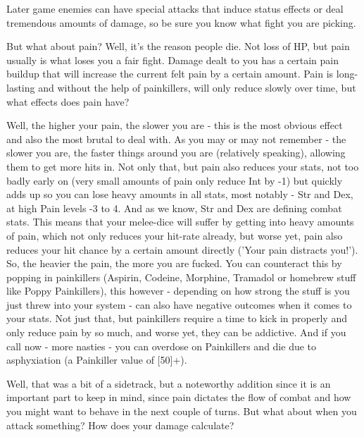 \documentclass[11pt]{report}
\begin{document}
Later game enemies can have special attacks that induce status effects or deal tremendous amounts of damage, so be sure you know what fight you are picking.

But what about pain? Well, it's the reason people die. Not loss of HP, but pain usually is what loses you a fair fight. Damage dealt to you has a certain pain buildup that will increase the current felt pain by a certain amount. Pain is long-lasting and without the help of painkillers, will only reduce slowly over time, but what effects does pain have?

Well, the higher your pain, the slower you are - this is the most obvious effect and also the most brutal to deal with. As you may or may not remember - the slower you are, the faster things around you are (relatively speaking), allowing them to get more hits in. Not only that, but pain also reduces your stats, not too badly early on (very small amounts of pain only reduce Int by -1) but quickly adds up so you can lose heavy amounts in all stats, most notably - Str and Dex, at high Pain levels -3 to 4. And as we know, Str and Dex are defining combat stats. This means that your melee-dice will suffer by getting into heavy amounts of pain, which not only reduces your hit-rate already, but worse yet, pain also reduces your hit chance by a certain amount directly ('Your pain distracts you!'). So, the heavier the pain, the more you are fucked. You can counteract this by popping in painkillers (Aspirin, Codeine, Morphine, Tramadol or homebrew stuff like Poppy Painkillers), this however - depending on how strong the stuff is you just threw into your system - can also have negative outcomes when it comes to your stats. Not just that, but painkillers require a time to kick in properly and only reduce pain by so much, and worse yet, they can be addictive. And if you call now - more nasties - you can overdose on Painkillers and die due to asphyxiation (a Painkiller value of [50]+).

Well, that was a bit of a sidetrack, but a noteworthy addition since it is an important part to keep in mind, since pain dictates the flow of combat and how you might want to behave in the next couple of turns. But what about when you attack something? How does your damage calculate?
\end{document}
